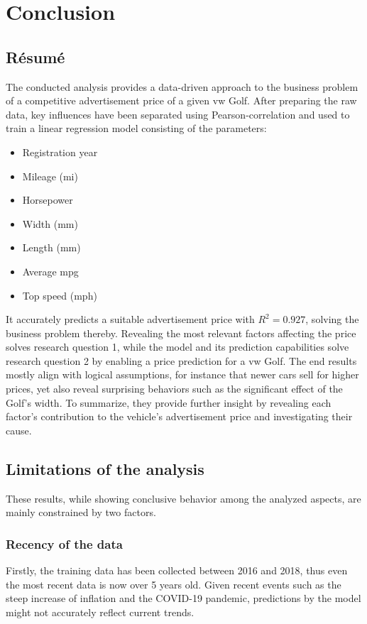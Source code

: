 \chapter{Conclusion}
\section{Résumé}

The conducted analysis provides a data-driven approach to the business problem of a competitive advertisement price of a given \ac{vw} Golf.
After preparing the raw data, key influences have been separated using Pearson-correlation and used to train a linear regression model consisting of the parameters:
\begin{itemize}
    \item Registration year
    \item Mileage (mi)
    \item Horsepower
    \item Width (mm)
    \item Length (mm)
    \item Average mpg
    \item Top speed (mph)
\end{itemize}
It accurately predicts a suitable advertisement price with $R^2 = 0.927$, solving the business problem thereby.
Revealing the most relevant factors affecting the price solves research question 1, while the model and its prediction capabilities solve research question 2 by enabling a price prediction for a \ac{vw} Golf.
The end results mostly align with logical assumptions, for instance that newer cars sell for higher prices, yet also reveal
surprising behaviors such as the significant effect of the Golf's width.
To summarize, they provide further insight by revealing each factor's contribution to the vehicle's advertisement price and investigating their cause.
\section{Limitations of the analysis}
These results, while showing conclusive behavior among the analyzed aspects, are mainly constrained by two factors.
\subsection{Recency of the data}
Firstly, the training data has been collected between 2016 and 2018, thus even the most recent data
is now over 5 years old. Given recent events such as the steep increase of inflation
and the COVID-19 pandemic, predictions by the model might not accurately reflect current trends.

